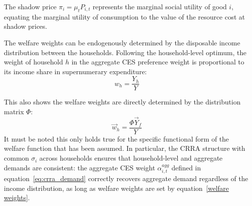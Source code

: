 \begin{corollary}
The shadow price $\pi_i = \mu_t P_{i,t}$ represents the marginal
social utility of good $i$, equating the marginal utility of
consumption to the value of the resource cost at shadow prices.
\end{corollary}

The welfare weights can be endogenously determined by the disposable income distribution between the households. Following the household-level optimum, the weight of household $h$ in the aggregate CES preference weight is proportional to its income share in supernumerary expenditure:
\begin{equation} \label{welfare weights}
    w_{h} = \frac{Y_{h}}{Y}
\end{equation}

This also shows the welfare weights are directly determined by the distribution matrix $\Phi$:
%
\begin{equation}
    \vec{w}_{h} = \frac{\Phi \vec{Y}_{f}}{Y}
\end{equation}
%
It must be noted this only holds true for the specific functional form
of the welfare function that has been assumed. In particular, the CRRA
structure with common $\sigma_i$ across households ensures that
household-level and aggregate demands are consistent: the aggregate
CES weight $\alpha^{agg}_{i,t}$ defined in
equation~\eqref{eq:crra_demand} correctly recovers aggregate demand
regardless of the income distribution, as long as welfare weights are
set by equation~\eqref{welfare weights}.
